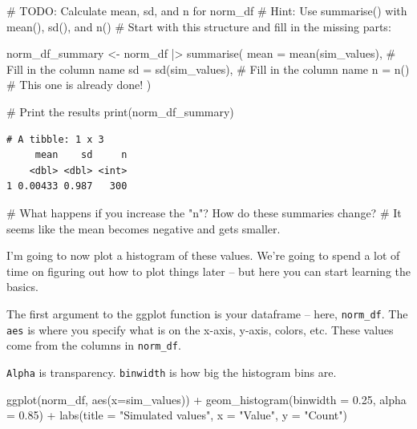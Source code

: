\documentclass[
  letterpaper,
  DIV=11,
  numbers=noendperiod]{scrartcl}
\newenvironment{Shaded}{\begin{snugshade}}{\end{snugshade}}
\newcommand{\AlertTok}[1]{\textcolor[rgb]{0.68,0.00,0.00}{#1}}
\newcommand{\AttributeTok}[1]{\textcolor[rgb]{0.40,0.45,0.13}{#1}}
\newcommand{\CommentTok}[1]{\textcolor[rgb]{0.37,0.37,0.37}{#1}}
\newcommand{\FloatTok}[1]{\textcolor[rgb]{0.68,0.00,0.00}{#1}}
\newcommand{\FunctionTok}[1]{\textcolor[rgb]{0.28,0.35,0.67}{#1}}
\newcommand{\NormalTok}[1]{\textcolor[rgb]{0.00,0.23,0.31}{#1}}
\newcommand{\OtherTok}[1]{\textcolor[rgb]{0.00,0.23,0.31}{#1}}
\newcommand{\SpecialCharTok}[1]{\textcolor[rgb]{0.37,0.37,0.37}{#1}}
\newcommand{\StringTok}[1]{\textcolor[rgb]{0.13,0.47,0.30}{#1}}
\begin{document}
\begin{Shaded}
\begin{Highlighting}[]
\CommentTok{\# }\AlertTok{TODO}\CommentTok{: Calculate mean, sd, and n for norm\_df}
\CommentTok{\# Hint: Use summarise() with mean(), sd(), and n()}
\CommentTok{\# Start with this structure and fill in the missing parts:}

\NormalTok{norm\_df\_summary }\OtherTok{\textless{}{-}}\NormalTok{ norm\_df }\SpecialCharTok{|\textgreater{}} 
  \FunctionTok{summarise}\NormalTok{(}
    \AttributeTok{mean =} \FunctionTok{mean}\NormalTok{(sim\_values),  }\CommentTok{\# Fill in the column name}
    \AttributeTok{sd =} \FunctionTok{sd}\NormalTok{(sim\_values),      }\CommentTok{\# Fill in the column name  }
    \AttributeTok{n =} \FunctionTok{n}\NormalTok{()            }\CommentTok{\# This one is already done!}
\NormalTok{  )}

\CommentTok{\# Print the results}
\FunctionTok{print}\NormalTok{(norm\_df\_summary)}
\end{Highlighting}
\end{Shaded}

\begin{verbatim}
# A tibble: 1 x 3
     mean    sd     n
    <dbl> <dbl> <int>
1 0.00433 0.987   300
\end{verbatim}

\begin{Shaded}
\begin{Highlighting}[]
\CommentTok{\# What happens if you increase the "n"? How do these summaries change?}
\CommentTok{\# It seems like the mean becomes negative and gets smaller.}
\end{Highlighting}
\end{Shaded}

I'm going to now plot a histogram of these values. We're going to spend
a lot of time on figuring out how to plot things later -- but here you
can start learning the basics.

The first argument to the ggplot function is your dataframe -- here,
\texttt{norm\_df}. The \texttt{aes} is where you specify what is on the
x-axis, y-axis, colors, etc. These values come from the columns in
\texttt{norm\_df}.

\texttt{Alpha} is transparency. \texttt{binwidth} is how big the
histogram bins are.

\begin{Shaded}
\begin{Highlighting}[]
\FunctionTok{ggplot}\NormalTok{(norm\_df, }\FunctionTok{aes}\NormalTok{(}\AttributeTok{x=}\NormalTok{sim\_values)) }\SpecialCharTok{+}
  \FunctionTok{geom\_histogram}\NormalTok{(}\AttributeTok{binwidth =} \FloatTok{0.25}\NormalTok{, }\AttributeTok{alpha =} \FloatTok{0.85}\NormalTok{) }\SpecialCharTok{+}
  \FunctionTok{labs}\NormalTok{(}\AttributeTok{title =} \StringTok{"Simulated values"}\NormalTok{, }\AttributeTok{x =} \StringTok{"Value"}\NormalTok{, }\AttributeTok{y =} \StringTok{"Count"}\NormalTok{)}
\end{Highlighting}
\end{Shaded}
\end{document}
